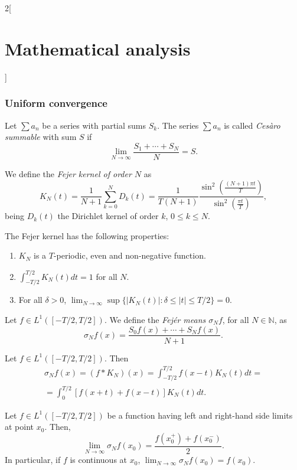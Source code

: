 \documentclass[class=article,crop=false]{standalone}
\begin{document}
\begin{multicols}{2}[\section{Mathematical analysis}]
\subsubsection*{Uniform convergence}
\begin{definition}
Let $\sum a_n$ be a series with partial sums $S_k$. The series $\sum a_n$ is called \textit{Cesàro summable} with sum $S$ if $$\lim_{N\to\infty}\frac{S_1+\cdots+S_N}{N}=S.$$
\end{definition}
\begin{definition}
We define the \textit{Fejer kernel of order $N$} as $$K_N(t)=\frac{1}{N+1}\sum_{k=0}^ND_k(t)=\frac{1}{T(N+1)}\frac{\sin^2\left(\frac{(N+1)\pi t}{T}\right)}{\sin^2\left(\frac{\pi t}{T}\right)},$$ being $D_k(t)$ the Dirichlet kernel of order $k$, $0\leq k\leq N$.
\end{definition}
\begin{prop}
The Fejer kernel has the following properties:
\begin{enumerate}
    \item $K_N$ is a $T$-periodic, even and non-negative function.
    \item $\displaystyle\int_{-T/2}^{T/2}K_N(t)dt=1$ for all $N$.
    \item For all $\delta>0$, $\displaystyle\lim_{N\to\infty}\sup\{|K_N(t)|:\delta\leq|t|\leq T/2\}=0$.
\end{enumerate}
\end{prop}
\begin{definition}
Let $f\in L^1([-T/2,T/2])$. We define the \textit{Fejér means $\sigma_Nf$}, for all $N\in\mathbb{N}$, as $$\sigma_Nf(x)=\frac{S_0f(x)+\cdots+S_Nf(x)}{N+1}.$$
\end{definition}
\begin{prop}
Let $f\in L^1([-T/2,T/2])$. Then \begin{multline*}\sigma_Nf(x)=(f*K_N)(x)=\int_{-T/2}^{T/2}f(x-t)K_N(t)dt=\\=\int_0^{T/2}[f(x+t)+f(x-t)]K_N(t)dt.\end{multline*}
\end{prop}
\begin{theorem}
Let $f\in L^1([-T/2,T/2])$ be a function having left and right-hand side limits at point $x_0$. Then, $$\lim_{N\to\infty}\sigma_Nf(x_0)=\frac{f(x_0^+)+f(x_0^-)}{2}.$$ In particular, if $f$ is continuous at $x_0$, $\displaystyle\lim_{N\to\infty}\sigma_Nf(x_0)=f(x_0).$
\end{theorem}
\begin{theorem}

\end{theorem}
\end{multicols}
\end{document}
